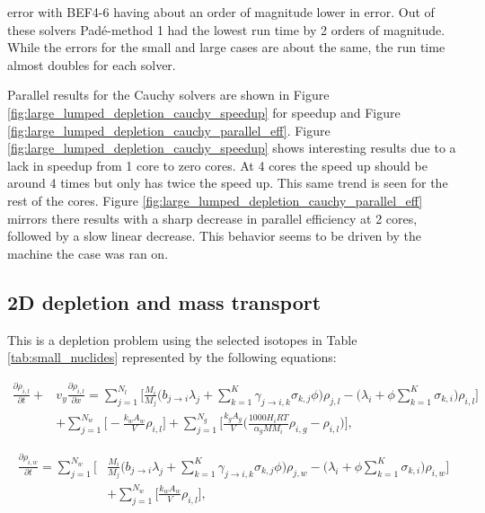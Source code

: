 \clearpage

\noindent error with BEF4-6 having about an order of magnitude lower in error. Out of these solvers Pad\'e-method 1 had the lowest run time by 2 orders of magnitude. While the errors for the small and large cases are about the same, the run time almost doubles for each solver. 

Parallel results for the Cauchy solvers are shown in Figure \ref{fig:large_lumped_depletion_cauchy_speedup} for speedup and Figure \ref{fig:large_lumped_depletion_cauchy_parallel_eff}. Figure \ref{fig:large_lumped_depletion_cauchy_speedup} shows interesting results due to a lack in speedup from 1 core to zero cores. At 4 cores the speed up should be around 4 times but only has twice the speed up. This same trend is seen for the rest of the cores. Figure \ref{fig:large_lumped_depletion_cauchy_parallel_eff} mirrors there results with a sharp decrease in parallel efficiency at 2 cores, followed by a slow linear decrease. This behavior seems to be driven by the machine the case was ran on. 




\subsection{2D depletion and mass transport}
This is a depletion problem using the selected isotopes in Table \ref{tab:small_nuclides} represented by the following equations:

\begin{equation}
\begin{split}
    \frac{\partial \rho_{i,l}}{\partial t} + &v_{y}\frac{\partial \rho_{i,l}}{\partial x}
    = 
    \sum_{j=1}^{N_{l}}\bigg[\frac{M_{i}}{M_{j}}\bigg(b_{j\rightarrow i}\lambda_{j} + 
    \sum_{k=1}^{K}\gamma_{j\rightarrow i,k}\sigma_{k,j}\phi \bigg)\rho_{j, l}
   - \bigg(\lambda_{i} + \phi\sum_{k=1}^{K} \sigma_{k,i}\bigg)\rho_{i, l} \bigg]\\& + \sum_{j=1}^{N_{w}} \bigg[-\frac{k_{w}A_{w}}{V}\rho_{i,l} \bigg] + \sum_{j=1}^{N_{g}} \bigg[  \frac{k_{g}A_{g}}{V}\bigg(\frac{1000H_{i}RT}{\alpha_{g}MM_{i}}\rho_{i, g} - \rho_{i,l}\bigg) \bigg],
    \label{eq:MSR2DDepletionSmallLiquidPhase}
\end{split}
\end{equation}

\begin{equation}
\begin{split}
    \frac{\partial \rho_{i,w}}{\partial t} = \sum_{j=1}^{N_{w}}\bigg[&\frac{M_{i}}{M_{j}}\bigg(b_{j\rightarrow i}\lambda_{j} + 
    \sum_{k=1}^{K}\gamma_{j\rightarrow i,k}\sigma_{k,j}\phi \bigg)\rho_{j, w}
    - \bigg(\lambda_{i} + \phi\sum_{k=1}^{K} \sigma_{k,i}\bigg)\rho_{i, w} \bigg]\\ &+ \sum_{j=1}^{N_{w}} \bigg[\frac{k_{w}A_{w}}{V}\rho_{i,l} \bigg],
    \label{eq:MSR2DDepletionSmallWallPhase}
\end{split}
\end{equation}

